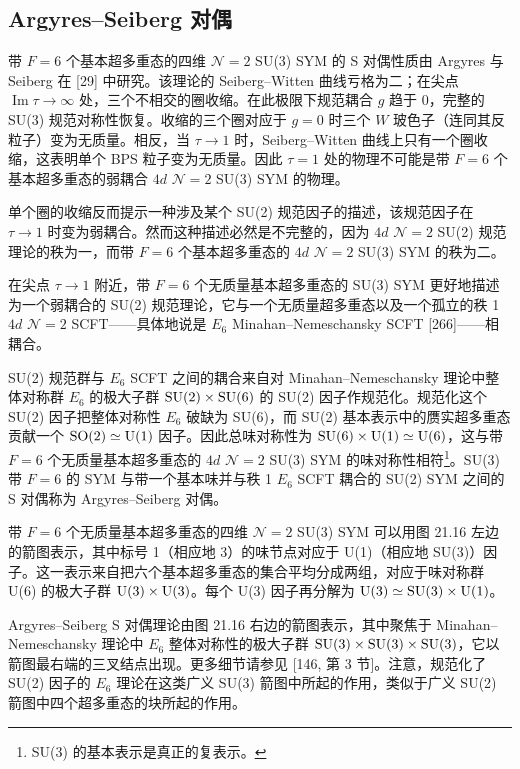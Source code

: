 \subsection{Argyres–Seiberg 对偶}

带 $F=6$ 个基本超多重态的四维 $\mathcal{N}=2$ SU(3) SYM 的 S 对偶性质由 Argyres 与 Seiberg 在 [29] 中研究。该理论的 Seiberg–Witten 曲线亏格为二；在尖点 $\operatorname{Im}\tau\to\infty$ 处，三个不相交的圈收缩。在此极限下规范耦合 $g$ 趋于 0，完整的 SU(3) 规范对称性恢复。收缩的三个圈对应于 $g=0$ 时三个 $W$ 玻色子（连同其反粒子）变为无质量。相反，当 $\tau\to1$ 时，Seiberg–Witten 曲线上只有一个圈收缩，这表明单个 BPS 粒子变为无质量。因此 $\tau=1$ 处的物理不可能是带 $F=6$ 个基本超多重态的弱耦合 $4d$ $\mathcal{N}=2$ SU(3) SYM 的物理。

单个圈的收缩反而提示一种涉及某个 SU(2) 规范因子的描述，该规范因子在 $\tau\to1$ 时变为弱耦合。然而这种描述必然是不完整的，因为 $4d$ $\mathcal{N}=2$ SU(2) 规范理论的秩为一，而带 $F=6$ 个基本超多重态的 $4d$ $\mathcal{N}=2$ SU(3) SYM 的秩为二。

\begin{proposition}[21.31] 在尖点 $\tau\to1$ 附近，带 $F=6$ 个无质量基本超多重态的 SU(3) SYM 更好地描述为一个弱耦合的 SU(2) 规范理论，它与一个无质量超多重态以及一个孤立的秩 1 $4d$ $\mathcal{N}=2$ SCFT——具体地说是 $E_6$ Minahan–Nemeschansky SCFT [266]——相耦合。
\end{proposition}

SU(2) 规范群与 $E_6$ SCFT 之间的耦合来自对 Minahan–Nemeschansky 理论中整体对称群 $E_6$ 的极大子群 $\operatorname{SU}(2)\times\operatorname{SU}(6)$ 的 SU(2) 因子作规范化。规范化这个 SU(2) 因子把整体对称性 $E_6$ 破缺为 SU(6)，而 SU(2) 基本表示中的赝实超多重态
贡献一个 $\operatorname{SO}(2)\simeq\operatorname{U}(1)$ 因子。因此总味对称性为 $\operatorname{SU}(6)\times\operatorname{U}(1)\simeq\operatorname{U}(6)$，这与带 $F=6$ 个无质量基本超多重态的 $4d$ $\mathcal{N}=2$ SU(3) SYM 的味对称性相符\footnote{SU(3) 的基本表示是真正的复表示。}。SU(3) 带 $F=6$ 的 SYM 与带一个基本味并与秩 1 $E_6$ SCFT 耦合的 SU(2) SYM 之间的 S 对偶称为 Argyres–Seiberg 对偶。

带 $F=6$ 个无质量基本超多重态的四维 $\mathcal{N}=2$ SU(3) SYM 可以用图 21.16 左边的箭图表示，其中标号 1（相应地 3）的味节点对应于 U(1)（相应地 SU(3)）因子。这一表示来自把六个基本超多重态的集合平均分成两组，对应于味对称群 U(6) 的极大子群 $\operatorname{U}(3)\times\operatorname{U}(3)$。每个 U(3) 因子再分解为 $\operatorname{U}(3)\simeq\operatorname{SU}(3)\times\operatorname{U}(1)$。

Argyres–Seiberg S 对偶理论由图 21.16 右边的箭图表示，其中聚焦于 Minahan–Nemeschansky 理论中 $E_6$ 整体对称性的极大子群 $\operatorname{SU}(3)\times\operatorname{SU}(3)\times\operatorname{SU}(3)$，它以箭图最右端的三叉结点出现。更多细节请参见 [146, 第 3 节]。注意，规范化了 SU(2) 因子的 $E_6$ 理论在这类广义 SU(3) 箭图中所起的作用，类似于广义 SU(2) 箭图中四个超多重态的块所起的作用。

